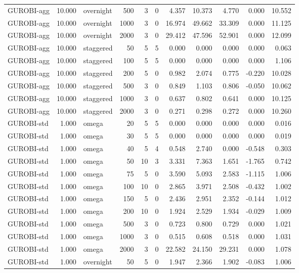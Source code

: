 \begin{table}[htbp]
\begin{tabular}{lrlrrlrrrrr}
GUROBI-agg & 10.000 & overnight & 500 & 3 & 0 & 4.357 & 10.373 & 4.770 & 0.000 & 10.552 \\
GUROBI-agg & 10.000 & overnight & 1000 & 3 & 0 & 16.974 & 49.662 & 33.309 & 0.000 & 11.125 \\
GUROBI-agg & 10.000 & overnight & 2000 & 3 & 0 & 29.412 & 47.596 & 52.901 & 0.000 & 12.099 \\
GUROBI-agg & 10.000 & staggered & 50 & 5 & 5 & 0.000 & 0.000 & 0.000 & 0.000 & 0.063 \\
GUROBI-agg & 10.000 & staggered & 100 & 5 & 5 & 0.000 & 0.000 & 0.000 & 0.000 & 1.106 \\
GUROBI-agg & 10.000 & staggered & 200 & 5 & 0 & 0.982 & 2.074 & 0.775 & -0.220 & 10.028 \\
GUROBI-agg & 10.000 & staggered & 500 & 3 & 0 & 0.849 & 1.103 & 0.806 & -0.050 & 10.062 \\
GUROBI-agg & 10.000 & staggered & 1000 & 3 & 0 & 0.637 & 0.802 & 0.641 & 0.000 & 10.125 \\
GUROBI-agg & 10.000 & staggered & 2000 & 3 & 0 & 0.271 & 0.298 & 0.272 & 0.000 & 10.260 \\
GUROBI-std & 1.000 & omega & 20 & 5 & 5 & 0.000 & 0.000 & 0.000 & 0.000 & 0.016 \\
GUROBI-std & 1.000 & omega & 30 & 5 & 5 & 0.000 & 0.000 & 0.000 & 0.000 & 0.019 \\
GUROBI-std & 1.000 & omega & 40 & 5 & 4 & 0.548 & 2.740 & 0.000 & -0.548 & 0.303 \\
GUROBI-std & 1.000 & omega & 50 & 10 & 3 & 3.331 & 7.363 & 1.651 & -1.765 & 0.742 \\
GUROBI-std & 1.000 & omega & 75 & 5 & 0 & 3.590 & 5.093 & 2.583 & -1.115 & 1.006 \\
GUROBI-std & 1.000 & omega & 100 & 10 & 0 & 2.865 & 3.971 & 2.508 & -0.432 & 1.002 \\
GUROBI-std & 1.000 & omega & 150 & 5 & 0 & 2.436 & 2.951 & 2.352 & -0.144 & 1.012 \\
GUROBI-std & 1.000 & omega & 200 & 10 & 0 & 1.924 & 2.529 & 1.934 & -0.029 & 1.009 \\
GUROBI-std & 1.000 & omega & 500 & 3 & 0 & 0.723 & 0.800 & 0.729 & 0.000 & 1.021 \\
GUROBI-std & 1.000 & omega & 1000 & 3 & 0 & 0.515 & 0.608 & 0.518 & 0.000 & 1.031 \\
GUROBI-std & 1.000 & omega & 2000 & 3 & 0 & 22.582 & 24.150 & 29.231 & 0.000 & 1.078 \\
GUROBI-std & 1.000 & overnight & 50 & 5 & 0 & 1.947 & 2.366 & 1.902 & -0.083 & 1.006 \\

\end{tabular}
\end{table}

